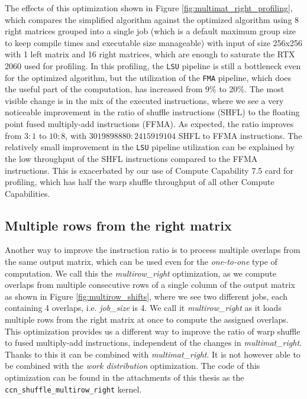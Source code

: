 The effects of this optimization shown in Figure \ref{fig:multimat_right_profiling}, which compares the simplified algorithm against the optimized algorithm using 8 right matrices grouped into a single job (which is a default maximum group size to keep compile times and executable size manageable) with input of size 256x256 with 1 left matrix and 16 right matrices, which are enough to saturate the RTX 2060 used for profiling. In this profiling, the \texttt{LSU} pipeline is still a bottleneck even for the optimized algorithm, but the utilization of the \texttt{FMA} pipeline, which does the useful part of the computation, has increased from 9\% to 20\%. The most visible change is in the mix of the executed instructions, where we see a very noticeable improvement in the ratio of shuffle instructions (SHFL) to the floating point fused multiply-add instructions (FFMA). As expected, the ratio improves from $3 : 1$ to $10 : 8$, with $3 019 898 880 : 2 415 919 104$ SHFL to FFMA instructions. The relatively small improvement in the \texttt{LSU} pipeline utilization can be explained by the low throughput of the SHFL instructions compared to the FFMA instructions. This is exacerbated by our use of Compute Capability 7.5 card for profiling, which has half the warp shuffle throughput of all other Compute Capabilities.

\subsection{Multiple rows from the right matrix}
\label{sec:multirow_right}

Another way to improve the instruction ratio is to process multiple overlaps from the same output matrix, which can be used even for the \textit{one-to-one} type of computation. We call this the \textit{multirow\_right} optimization, as we compute overlaps from multiple consecutive rows of a single column of the output matrix as shown in Figure \ref{fig:multirow_shifts}, where we see two different jobs, each containing 4 overlaps, i.e. \textit{job\_size} is 4. We call it \textit{multirow\_right} as it loads multiple rows from the right matrix at once to compute the assigned overlaps. This optimization provides us a different way to improve the ratio of warp shuffle to fused multiply-add instructions, independent of the changes in \textit{multimat\_right}. Thanks to this it can be combined with \textit{multimat\_right}. It is not however able to be combined with the \textit{work distribution} optimization. The code of this optimization can be found in the attachments of this thesis as the \texttt{ccn\_shuffle\_multirow\_right} kernel. 



